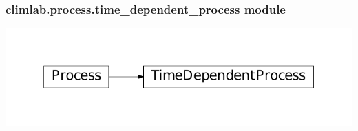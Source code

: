\documentclass[a4paper,10pt,english]{sphinxmanual}
\begin{document}
\subsubsection{climlab.process.time\_dependent\_process module}
\label{api/climlab.process:climlab-process-time-dependent-process-module}
\includegraphics{inheritance-4aacab269f029f3f3453e58b89ba9679db78b256.pdf}
\label{api/climlab.process:module-climlab.process.time_dependent_process}
\end{document}
